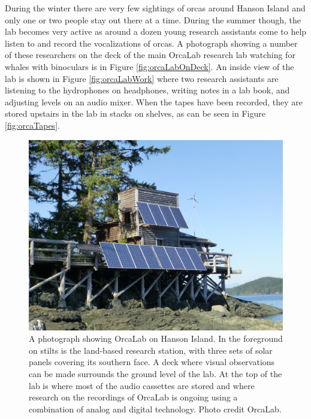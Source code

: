 During the winter there are very few sightings of orcas around Hanson
Island and only one or two people stay out there at a time.  During
the summer though, the lab becomes very active as around a dozen young
research assistants come to help listen to and record the
vocalizations of orcas.  A photograph showing a number of these
researchers on the deck of the main OrcaLab research lab watching for
whales with binoculars is in Figure \ref{fig:orcaLabOnDeck}.  An
inside view of the lab is shown in Figure \ref{fig:orcaLabWork} where
two research assistants are listening to the hydrophones on
headphones, writing notes in a lab book, and adjusting levels on an
audio mixer.  When the tapes have been recorded, they are stored
upstairs in the lab in stacks on shelves, as can be seen in Figure
\ref{fig:orcaTapes}.

\begin{figure}[t]
\centering
\includegraphics[width=\columnwidth]{figures/orcaLab}
\caption{A photograph showing OrcaLab on Hanson Island.  In the
  foreground on stilts is the land-based research station, with three
  sets of solar panels covering its southern face.  A deck where
  visual observations can be made surrounds the ground level of the
  lab.  At the top of the lab is where most of the audio cassettes are
  stored and where research on the recordings of OrcaLab is ongoing
  using a combination of analog and digital technology. Photo credit OrcaLab.}
\label{fig:orcaLab}
\end{figure}

